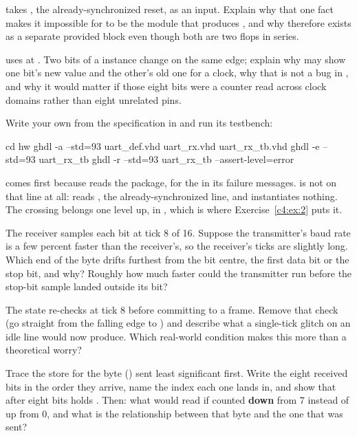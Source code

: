   takes , the already-synchronized reset, as an input. Explain
why that one fact makes it impossible for  to be the module that produces
, and why  therefore exists as a separate provided block even
though both are two flops in series.

  uses  at . Two bits of a 
instance change on the same edge; explain why  may show one bit's new value and the
other's old one for a clock, why that is not a bug in , and why it would matter if those
eight bits were a counter read across clock domains rather than eight unrelated pins.

\label{c3:ex:2}

 Write your own  from the specification in  and
run its testbench:

\begin{shell}
cd hw
ghdl -a --std=93 uart_def.vhd uart_rx.vhd uart_rx_tb.vhd
ghdl -e --std=93 uart_rx_tb
ghdl -r --std=93 uart_rx_tb --assert-level=error
\end{shell}

\noindent {} comes first because  reads the package, for the
 in its failure messages.  is not on that line at all: 
reads , the already-synchronized line, and instantiates nothing. The crossing belongs
one level up, in , which is where Exercise~\ref{c4:ex:2} puts it.

 The receiver samples each bit at tick 8 of 16. Suppose the transmitter's baud rate is a
few percent faster than the receiver's, so the receiver's ticks are slightly long. Which end of the
byte drifts furthest from the bit centre, the first data bit or the stop bit, and why? Roughly how
much faster could the transmitter run before the stop-bit sample landed outside its bit?

 The  state re-checks  at tick 8 before committing to a
frame. Remove that check (go straight from the falling edge to ) and describe what
a single-tick glitch on an idle line would now produce. Which real-world condition makes this more
than a theoretical worry?

 Trace the store  for the byte 
() sent least significant first. Write the eight received bits in the order they
arrive, name the index each one lands in, and show that after eight bits  holds
. Then: what would  read if  counted \textbf{down} from 7
instead of up from 0, and what is the relationship between that byte and the one that was sent?
